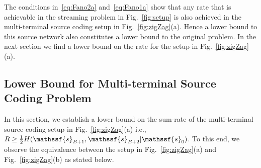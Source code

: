 \documentclass[journal, twocolumn, 10pt]{IEEEtran}
\newcommand{\eps}{\varepsilon}
\newcommand{\rvf}{{\mathssf{f}}}    %
\newcommand{\rvs}{{\mathssf{s}}}    %
\begin{document}
 
The conditions in~\eqref{eq:Fano2a} and~\eqref{eq:Fano1a} show that any rate that is achievable in the streaming problem in Fig.~\ref{fig:setup} is also achieved in the multi-terminal source coding setup in Fig.~\ref{fig:zigZag}(a). Hence a lower bound to this source network also constitutes a lower bound to the original problem. In the next section we find a lower bound on the rate for the setup in Fig.~\ref{fig:zigZag}(a).

\subsection{Lower Bound for Multi-terminal Source Coding Problem}
In this section, we establish a lower bound on the sum-rate of the multi-terminal source coding setup in Fig.~\ref{fig:zigZag}(a) i.e., $R \ge \frac{1}{2}H(\rvs_{B+1}, \rvs_{B+2}|\rvs_0)$. To this end, we observe the equivalence between the setup in 
Fig.~\ref{fig:zigZag}(a) and Fig.~\ref{fig:zigZag}(b) as stated below.

\end{document}
